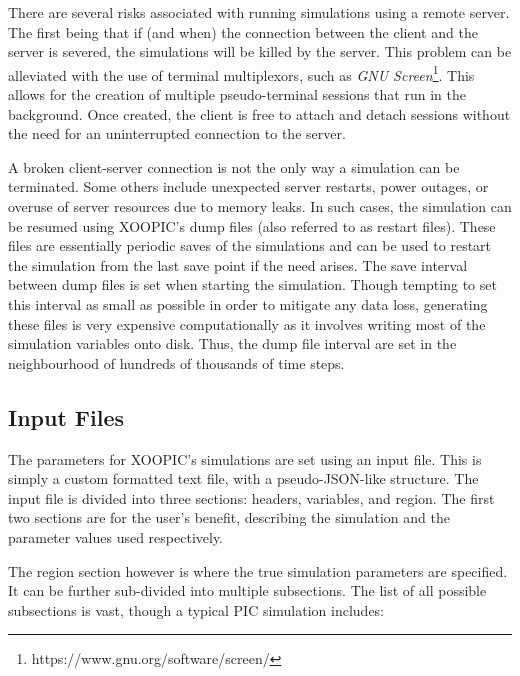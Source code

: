 There are several risks associated with running simulations using a remote server. The first being that if (and when) the connection between the client and the server is severed, the simulations will be killed by the server. This problem can be alleviated with the use of terminal multiplexors, such as \textit{GNU Screen}\footnote{https://www.gnu.org/software/screen/}. This allows for the creation of multiple pseudo-terminal sessions that run in the background. Once created, the client is free to attach and detach sessions without the need for an uninterrupted connection to the server. 

A broken client-server connection is not the only way a simulation can be terminated. Some others include unexpected server restarts, power outages, or overuse of server resources due to memory leaks. In such cases, the simulation can be resumed using XOOPIC's dump files (also referred to as restart files). These files are essentially periodic saves of the simulations and can be used to restart the simulation from the last save point if the need arises. The save interval between dump files is set when starting the simulation. Though tempting to set this interval as small as possible in order to mitigate any data loss, generating these files is very expensive computationally as it involves writing most of the simulation variables onto disk. Thus, the dump file interval are set in the neighbourhood of hundreds of thousands of time steps. 

\subsection{Input Files}

The parameters for XOOPIC's simulations are set using an input file. This is simply a custom formatted text file, with a pseudo-JSON-like structure. The input file is divided into three sections: headers, variables, and region. The first two sections are for the user's benefit, describing the simulation and the parameter values used respectively. 

The region section however is where the true simulation parameters are specified. It can be further sub-divided into multiple subsections. The list of all possible subsections is vast, though a typical PIC simulation includes:

